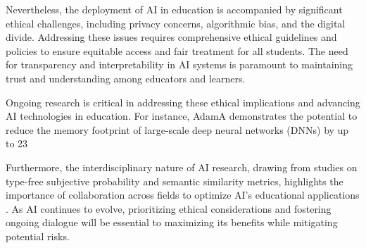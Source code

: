 Nevertheless, the deployment of AI in education is accompanied by significant ethical challenges, including privacy concerns, algorithmic bias, and the digital divide. Addressing these issues requires comprehensive ethical guidelines and policies to ensure equitable access and fair treatment for all students. The need for transparency and interpretability in AI systems is paramount to maintaining trust and understanding among educators and learners.



Ongoing research is critical in addressing these ethical implications and advancing AI technologies in education. For instance, AdamA demonstrates the potential to reduce the memory footprint of large-scale deep neural networks (DNNs) by up to 23%



Furthermore, the interdisciplinary nature of AI research, drawing from studies on type-free subjective probability and semantic similarity metrics, highlights the importance of collaboration across fields to optimize AI's educational applications . As AI continues to evolve, prioritizing ethical considerations and fostering ongoing dialogue will be essential to maximizing its benefits while mitigating potential risks.